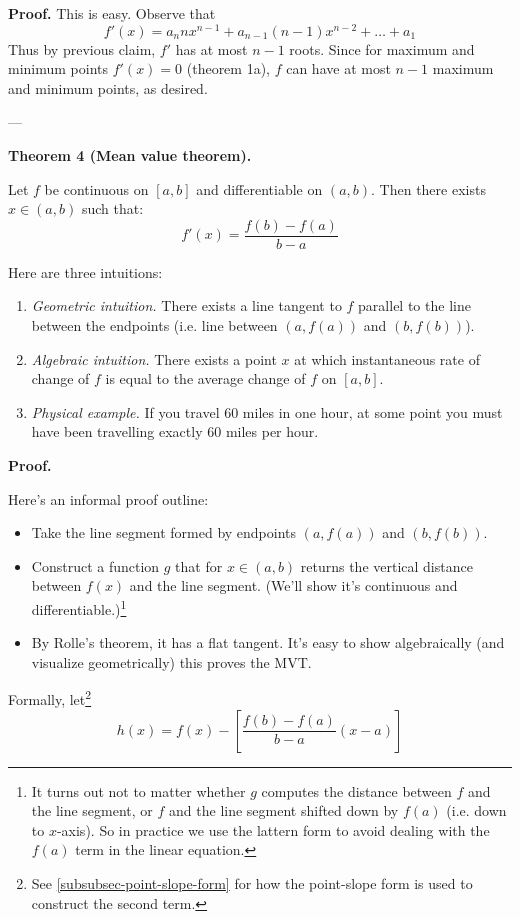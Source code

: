 \textbf{Proof.} This is easy. Observe that
\[f'(x)=a_n n x^{n-1} + a_{n-1} (n-1) x^{n-2} + \dots + a_1\] Thus by
previous claim, $f'$ has at most $n-1$ roots. Since for maximum and
minimum points $f'(x)=0$ (theorem 1a), $f$ can have at most $n-1$
maximum and minimum points, as desired.

\vs---\vs

\textbf{Theorem 4 (Mean value theorem).}

Let $f$ be continuous on $[a,b]$ and differentiable on $(a,b)$. Then
there exists $x\in(a,b)$ such that:
\[f'(x)=\frac{f(b)-f(a)}{b-a}\]

Here are three intuitions:
\begin{enumerate}
\item \textit{Geometric intuition.} There exists a line tangent to $f$
  parallel to the line between the endpoints (i.e. line between
  $(a, f(a))$ and $(b, f(b))$).
\item \textit{Algebraic intuition.} There exists a point $x$ at which
  instantaneous rate of change of $f$ is equal to the average change
  of $f$ on $[a,b]$.
\item \textit{Physical example.} If you travel 60 miles in one hour,
  at some point you must have been travelling exactly 60 miles per
  hour.
\end{enumerate}

\textbf{Proof.}

Here's an informal proof outline:
\begin{itemize}
\item Take the line segment formed by endpoints $(a,f(a))$ and
  $(b,f(b))$.
\item Construct a function $g$ that for $x\in(a,b)$ returns the vertical
  distance between $f(x)$ and the line segment. (We'll show it's
  continuous and differentiable.)\footnote{It turns out not to matter
    whether $g$ computes the distance between $f$ and the line
    segment, or $f$ and the line segment shifted down by $f(a)$ (i.e.
    down to $x$-axis). So in practice we use the lattern form to avoid
    dealing with the $f(a)$ term in the linear equation.}
\item By Rolle's theorem, it has a flat tangent. It's easy to show
  algebraically (and visualize geometrically) this proves the MVT.
\end{itemize}

Formally, let\footnote{See \ref{subsubsec-point-slope-form} for how
  the point-slope form is used to construct the second term.}
\[h(x)=f(x)-\left[\frac{f(b)-f(a)}{b-a}(x-a)\right]\]

